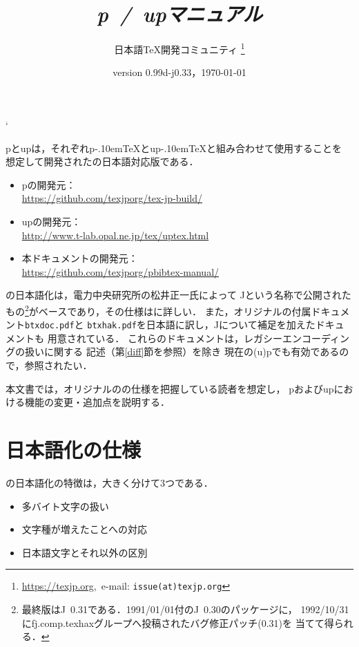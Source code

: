 \documentclass[a4paper,11pt,nomag,dvipdfmx]{jsarticle}
\def\file#1{\texttt{#1}}
\def\pTeX{p\kern-.10em\TeX}
\def\upTeX{u\pTeX}
\def\JBibTeX{\leavevmode\textcompwordmark\lower.5ex\hbox{J}\kern-.08em\BibTeX}
\def\pBibTeX{p\kern-.05em\BibTeX}
\def\upBibTeX{u\pBibTeX}
\def\JBibTeX{J\BibTeX}%
\def\pBibTeX{p\BibTeX}%
\def\upBibTeX{u\pBibTeX}%
\begin{document}
\catcode`
\title{\emph{\pBibTeX~/~\upBibTeX マニュアル}}
\author{日本語\TeX 開発コミュニティ\null
\thanks{\url{https://texjp.org},\ e-mail: \texttt{issue(at)texjp.org}}}
\date{version 0.99d-j0.33，\today}
\maketitle

\pBibTeX と\upBibTeX は，それぞれ\pTeX と\upTeX と組み合わせて使用することを
想定して開発された\BibTeX の日本語対応版である．
\begin{itemize}
  \item \pBibTeX の開発元：\\
    \url{https://github.com/texjporg/tex-jp-build/}
  \item \upBibTeX の開発元：\\
    \url{http://www.t-lab.opal.ne.jp/tex/uptex.html}
  \item 本ドキュメントの開発元：\\
    \url{https://github.com/texjporg/pbibtex-manual/}
\end{itemize}

\BibTeX の日本語化は，電力中央研究所の松井正一氏によって
\JBibTeX という名称で公開されたもの\footnote{%
最終版は\JBibTeX~0.31である．1991/01/01付の\JBibTeX~0.30のパッケージに，
1992/10/31にfj.comp.texhaxグループへ投稿されたバグ修正パッチ(0.31)を
当てて得られる．}がベースであり，その仕様は\cite{jbibtex}に詳しい．
また，オリジナルの\BibTeX 付属ドキュメント\file{btxdoc.pdf}と
\file{btxhak.pdf}を日本語に訳し，\JBibTeX について補足を加えたドキュメントも
用意されている\cite{jbtxdoc,jbtxhak}．
これらのドキュメントは，レガシーエンコーディングの扱いに関する
記述（第\ref{diff}節を参照）を除き
現在の(u)\pBibTeX でも有効であるので，参照されたい．

本文書では，オリジナルの\BibTeX の仕様を把握している読者を想定し，
\pBibTeX および\upBibTeX における機能の変更・追加点を説明する．

\tableofcontents
\clearpage

\section{日本語化の仕様}

\BibTeX の日本語化の特徴は，大きく分けて3つである．
\begin{itemize}
 \item 多バイト文字の扱い
 \item 文字種が増えたことへの対応
 \item 日本語文字とそれ以外の区別
\end{itemize}
\end{document}
